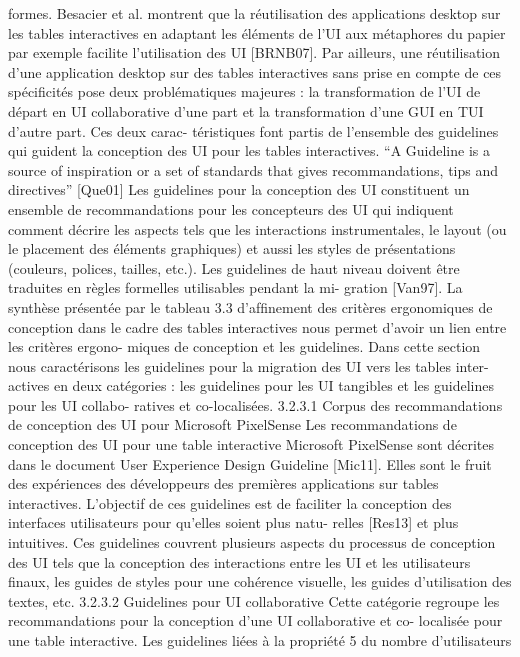 \documentclass{article}
\begin{document}
formes. Besacier et al. montrent que la réutilisation des applications desktop sur les tables interactives
en adaptant les éléments de l’UI aux métaphores du papier par exemple facilite l’utilisation des UI
[BRNB07].
Par ailleurs, une réutilisation d’une application desktop sur des tables interactives sans prise en
compte de ces spéciﬁcités pose deux problématiques majeures : la transformation de l’UI de départ
en UI collaborative d’une part et la transformation d’une GUI en TUI d’autre part. Ces deux carac-
téristiques font partis de l’ensemble des guidelines qui guident la conception des UI pour les tables
interactives.
“A Guideline is a source of inspiration or a set of standards that gives recommandations, tips and
directives” [Que01]
Les guidelines pour la conception des UI constituent un ensemble de recommandations pour les
concepteurs des UI qui indiquent comment décrire les aspects tels que les interactions instrumentales,
le layout (ou le placement des éléments graphiques) et aussi les styles de présentations (couleurs,
polices, tailles, etc.).
Les guidelines de haut niveau doivent être traduites en règles formelles utilisables pendant la mi-
gration [Van97]. La synthèse présentée par le tableau 3.3 d’afﬁnement des critères ergonomiques de
conception dans le cadre des tables interactives nous permet d’avoir un lien entre les critères ergono-
miques de conception et les guidelines.
Dans cette section nous caractérisons les guidelines pour la migration des UI vers les tables inter-
actives en deux catégories : les guidelines pour les UI tangibles et les guidelines pour les UI collabo-
ratives et co-localisées.
3.2.3.1
Corpus des recommandations de conception des UI pour Microsoft PixelSense
Les recommandations de conception des UI pour une table interactive Microsoft PixelSense
sont décrites dans le document User Experience Design Guideline [Mic11]. Elles sont le fruit des
expériences des développeurs des premières applications sur tables interactives. L’objectif de ces
guidelines est de faciliter la conception des interfaces utilisateurs pour qu’elles soient plus natu-
relles [Res13] et plus intuitives. Ces guidelines couvrent plusieurs aspects du processus de conception
des UI tels que la conception des interactions entre les UI et les utilisateurs ﬁnaux, les guides de styles
pour une cohérence visuelle, les guides d’utilisation des textes, etc.
3.2.3.2
Guidelines pour UI collaborative
Cette catégorie regroupe les recommandations pour la conception d’une UI collaborative et co-
localisée pour une table interactive. Les guidelines liées à la propriété 5 du nombre d’utilisateurs
\end{document}
